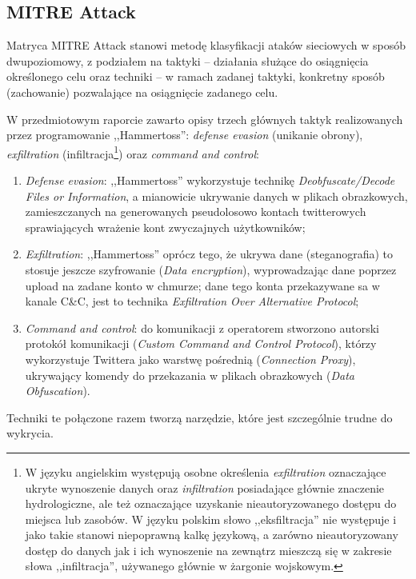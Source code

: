 \documentclass{eiti-raport}
\begin{document}
\begin{multicols*}{2}
\section{MITRE Attack}
Matryca MITRE Attack stanowi metodę klasyfikacji ataków sieciowych w sposób dwupoziomowy, z podziałem na taktyki -- działania służące do osiągnięcia określonego celu oraz techniki -- w ramach zadanej taktyki, konkretny sposób (zachowanie) pozwalające na osiągnięcie zadanego celu.

W przedmiotowym raporcie zawarto opisy trzech głównych taktyk realizowanych przez programowanie ,,Hammertoss'': \textit{defense evasion} (unikanie obrony), \textit{exfiltration} (infiltracja\footnote{W języku angielskim występują osobne określenia \textit{exfiltration} oznaczające ukryte wynoszenie danych oraz \textit{infiltration} posiadające głównie znaczenie hydrologiczne, ale też oznaczające uzyskanie nieautoryzowanego dostępu do miejsca lub zasobów. W języku polskim słowo ,,eksfiltracja'' nie występuje i jako takie stanowi niepoprawną kalkę językową, a zarówno nieautoryzowany dostęp do danych jak i ich wynoszenie na zewnątrz mieszczą się w zakresie słowa ,,infiltracja'', używanego głównie w żargonie wojskowym.}) oraz \textit{command and control}:
\begin{enumerate}
	\item \textit{Defense evasion}: ,,Hammertoss'' wykorzystuje technikę \textit{Deobfuscate/Decode Files or Information}, a mianowicie ukrywanie danych w plikach obrazkowych, zamieszczanych na generowanych pseudolosowo kontach twitterowych sprawiających wrażenie kont zwyczajnych użytkowników;
	\item \textit{Exfiltration}: ,,Hammertoss'' oprócz tego, że ukrywa dane (steganografia) to stosuje jeszcze szyfrowanie (\textit{Data encryption}), wyprowadzając dane poprzez upload na zadane konto w chmurze; dane tego konta przekazywane sa w kanale C\&C, jest to technika \textit{Exfiltration Over Alternative Protocol};
	\item \textit{Command and control}: do komunikacji z operatorem stworzono autorski protokół komunikacji (\textit{Custom Command and Control Protocol}), którzy wykorzystuje Twittera jako warstwę pośrednią (\textit{Connection Proxy}), ukrywający komendy do przekazania w plikach obrazkowych (\textit{Data Obfuscation}).
\end{enumerate}
Techniki te połączone razem tworzą narzędzie, które jest szczególnie trudne do wykrycia. 


\end{multicols*}
\end{document}
